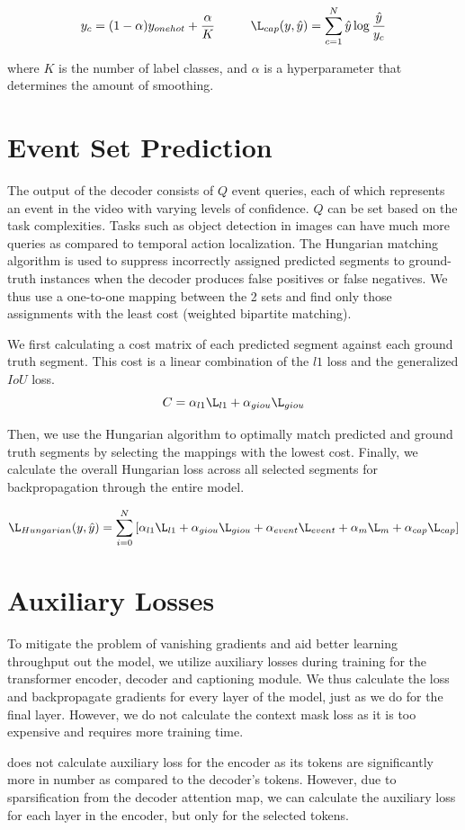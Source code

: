 $$y _{c}= (1 - \alpha)y_{onehot} + \frac{\alpha}{K} \hspace{1cm} \L_{cap}(y, \hat{y}) = \sum_{c=1}^{N}\hat{y} \log{\frac{\hat{y}}{y_c}}$$

\par where $K$ is the number of label classes, and $\alpha$ is a hyperparameter that determines the amount of smoothing.

\section{Event Set Prediction}
\par The output of the decoder consists of $Q$ event queries, each of which represents an event in the video with varying levels of confidence. $Q$ can be set based on the task complexities. Tasks such as object detection in images can have much more queries as compared to temporal action localization. The Hungarian matching algorithm \cite{hungarian} is used to suppress incorrectly assigned predicted segments to ground-truth instances when the decoder produces false positives or false negatives. We thus use a one-to-one mapping between the 2 sets and find only those assignments with the least cost (weighted bipartite matching).
\par We first calculating a cost matrix of each predicted segment against each ground truth segment. This cost is a linear combination of the $l1$ loss and the generalized $IoU$ loss.
$$ C = \alpha_{l1}\L_{l1}  + \alpha_{giou}\L_{giou}$$
\par Then, we use the Hungarian algorithm to optimally match predicted and ground truth segments by selecting the mappings with the lowest cost. Finally, we calculate the overall Hungarian loss across all selected segments for backpropagation through the entire model.

$$\L_{Hungarian}(y, \hat{y}) = \sum_{i=0}^{N}\left [ \alpha_{l1}\L_{l1} + \alpha_{giou}\L_{giou} + \alpha_{event}\L_{event} + \alpha_{m}\L_{m} + \alpha_{cap}\L_{cap} \right ]$$

\section{Auxiliary Losses} \label{chapter:aux}
\par To mitigate the problem of vanishing gradients and aid better learning throughput out the model, we utilize auxiliary losses during training for the transformer encoder, decoder and captioning module. We thus calculate the loss and backpropagate gradients for every layer of the model, just as we do for the final layer. However, we do not calculate the context mask loss as it is too expensive and requires more training time.
\par \cite{carion2020detr} does not calculate auxiliary loss for the encoder as its tokens are significantly more in number as compared to the decoder's tokens. However, due to sparsification from the decoder attention map, we can calculate the auxiliary loss for each layer in the encoder, but only for the selected tokens. 




